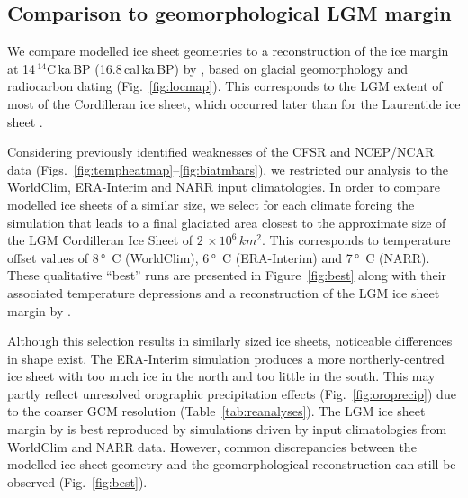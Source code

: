 \subsection{Comparison to geomorphological LGM margin}

We compare modelled ice sheet geometries to a reconstruction of the ice margin at 14\,$^{14}$C\,ka\,BP (16.8\,cal\,ka\,BP) by \citet{dyke-2004}, based on glacial geomorphology and radiocarbon dating (Fig.~\ref{fig:locmap}). This corresponds to the LGM extent of most of the Cordilleran ice sheet, which occurred later than for the Laurentide ice sheet \citep{porter-swanson-1998,dyke-2004,stroeven-etal-2010,stroeven-etal-inpress}.

Considering previously identified weaknesses of the CFSR and NCEP/NCAR data (Figs.~\ref{fig:tempheatmap}--\ref{fig:biatmbars}), we restricted our analysis to the WorldClim, ERA-Interim and NARR input climatologies. In order to compare modelled ice sheets of a similar size, we select for each climate forcing the simulation that leads to a final glaciated area closest to the approximate size of the LGM Cordilleran Ice Sheet of $2\,\times10^6\,\unit{km^2}$. This corresponds to temperature offset values of 8\,\unit{\degree C} (WorldClim), 6\,\unit{\degree C} (ERA-Interim) and 7\,\unit{\degree C} (NARR). These qualitative “best” runs are presented in Figure~\ref{fig:best} along with their associated temperature depressions and a reconstruction of the LGM ice sheet margin by \citet{dyke-2004}.

Although this selection results in similarly sized ice sheets, noticeable differences in shape exist. The ERA-Interim simulation produces a more northerly-centred ice sheet with too much ice in the north and too little in the south. This may partly reflect unresolved orographic precipitation effects (Fig.~\ref{fig:oroprecip}) due to the coarser GCM resolution (Table~\ref{tab:reanalyses}). The LGM ice sheet margin by \citet{dyke-2004} is best reproduced by simulations driven by input climatologies from WorldClim and NARR data. However, common discrepancies between the modelled ice sheet geometry and the geomorphological reconstruction can still be observed (Fig.~\ref{fig:best}).


